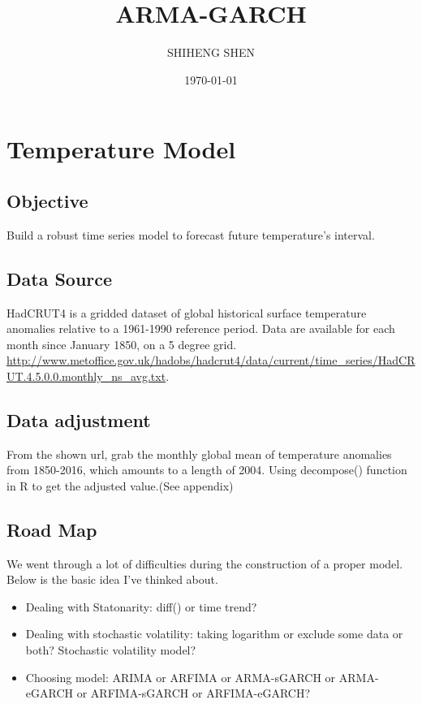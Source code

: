 \documentclass[a4paper, 9pt]{article}
\title{ARMA-GARCH}
\author{SHIHENG SHEN}
\date{\today}
\begin{document}
\maketitle

\section{Temperature Model}
\subsection{Objective}
Build a robust time series model to forecast future temperature's interval. 


\subsection{Data Source}
HadCRUT4 is a gridded dataset of global historical surface temperature anomalies relative to a 1961-1990 reference period. Data are available for each month since January 1850, on a 5 degree grid. \url{http://www.metoffice.gov.uk/hadobs/hadcrut4/data/current/time_series/HadCRUT.4.5.0.0.monthly_ns_avg.txt}.

\subsection{Data adjustment}
From the shown url, grab the monthly global mean of temperature anomalies from 1850-2016, which amounts to a length of 2004. Using decompose() function in R to get the adjusted value.(See appendix)  

\subsection{Road Map}
We went through a lot of difficulties during the construction of a proper model. Below is the basic idea I've thinked about.\par
\begin{itemize}
\item Dealing with Statonarity: diff() or time trend?
\item Dealing with stochastic volatility: taking logarithm or exclude some data or both? Stochastic volatility model?
\item Choosing model: ARIMA or ARFIMA or ARMA-sGARCH or ARMA-eGARCH or ARFIMA-sGARCH or ARFIMA-eGARCH?
\end{itemize}
\end{document}
